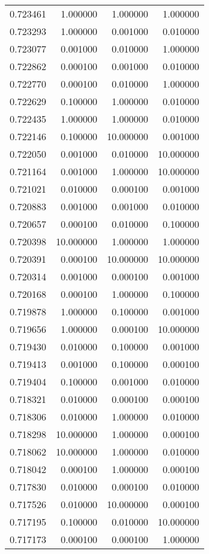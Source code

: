 \begin{tabular}{rrrr}
0.723461 & 1.000000 & 1.000000 & 1.000000 \\
0.723293 & 1.000000 & 0.001000 & 0.010000 \\
0.723077 & 0.001000 & 0.010000 & 1.000000 \\
0.722862 & 0.000100 & 0.001000 & 0.010000 \\
0.722770 & 0.000100 & 0.010000 & 1.000000 \\
0.722629 & 0.100000 & 1.000000 & 0.010000 \\
0.722435 & 1.000000 & 1.000000 & 0.010000 \\
0.722146 & 0.100000 & 10.000000 & 0.001000 \\
0.722050 & 0.001000 & 0.010000 & 10.000000 \\
0.721164 & 0.001000 & 1.000000 & 10.000000 \\
0.721021 & 0.010000 & 0.000100 & 0.001000 \\
0.720883 & 0.001000 & 0.001000 & 0.010000 \\
0.720657 & 0.000100 & 0.010000 & 0.100000 \\
0.720398 & 10.000000 & 1.000000 & 1.000000 \\
0.720391 & 0.000100 & 10.000000 & 10.000000 \\
0.720314 & 0.001000 & 0.000100 & 0.001000 \\
0.720168 & 0.000100 & 1.000000 & 0.100000 \\
0.719878 & 1.000000 & 0.100000 & 0.001000 \\
0.719656 & 1.000000 & 0.000100 & 10.000000 \\
0.719430 & 0.010000 & 0.100000 & 0.001000 \\
0.719413 & 0.001000 & 0.100000 & 0.000100 \\
0.719404 & 0.100000 & 0.001000 & 0.010000 \\
0.718321 & 0.010000 & 0.000100 & 0.000100 \\
0.718306 & 0.010000 & 1.000000 & 0.010000 \\
0.718298 & 10.000000 & 1.000000 & 0.000100 \\
0.718062 & 10.000000 & 1.000000 & 0.010000 \\
0.718042 & 0.000100 & 1.000000 & 0.000100 \\
0.717830 & 0.010000 & 0.000100 & 0.010000 \\
0.717526 & 0.010000 & 10.000000 & 0.000100 \\
0.717195 & 0.100000 & 0.010000 & 10.000000 \\
0.717173 & 0.000100 & 0.000100 & 1.000000 \\

\end{tabular}
